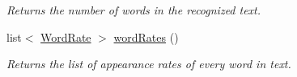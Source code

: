 \begin{CompactItemize}
\begin{CompactList}\small\item\em Returns the number of words in the recognized text. \item\end{CompactList}\item 
\hypertarget{class_statistics_0f43409d0bfd86d1c25f3be17ea9084a}{
list$<$ \hyperlink{struct_word_rate}{WordRate} $>$ \hyperlink{class_statistics_0f43409d0bfd86d1c25f3be17ea9084a}{wordRates} ()}
\label{class_statistics_0f43409d0bfd86d1c25f3be17ea9084a}

\begin{CompactList}\small\item\em Returns the list of appearance rates of every word in text. \item\end{CompactList}\end{CompactItemize}
